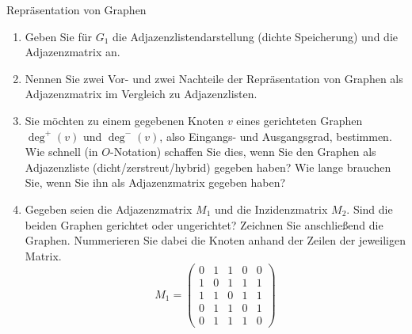 \documentclass[11pt,a4paper]{article}
\begin{document}
\begin{aufgabe}{1}{Repräsentation von Graphen}
\begin{figure}[h!]
    \end{figure}
    \begin{enumerate}
        \item Geben Sie für $G_1$ die Adjazenzlistendarstellung (dichte Speicherung) und die Adjazenzmatrix an.
        \item Nennen Sie zwei Vor- und zwei Nachteile der Repräsentation von Graphen als Adjazenzmatrix im Vergleich zu Adjazenzlisten.
        \item Sie möchten zu einem gegebenen Knoten $v$ eines gerichteten Graphen $\operatorname{deg}^+(v)$ und $\operatorname{deg}^-(v)$, also Eingangs- und Ausgangsgrad, bestimmen.
        Wie schnell (in $O$-Notation) schaffen Sie dies, wenn Sie den Graphen als Adjazenzliste (dicht/zerstreut/hybrid) gegeben haben?
        Wie lange brauchen Sie, wenn Sie ihn als Adjazenzmatrix gegeben haben?
        \item 
        Gegeben seien die Adjazenzmatrix $M_1$ und die Inzidenzmatrix $M_2$.
        Sind die beiden Graphen gerichtet oder ungerichtet?
        Zeichnen Sie anschließend die Graphen.
        Nummerieren Sie dabei die Knoten anhand der Zeilen der jeweiligen Matrix.
        \begin{equation*}
            M_1 = \begin{pmatrix}
                0 & 1 & 1 & 0 & 0 \\
                1 & 0 & 1 & 1 & 1 \\
                1 & 1 & 0 & 1 & 1 \\
                0 & 1 & 1 & 0 & 1 \\
                0 & 1 & 1 & 1 & 0 

\end{pmatrix}
\end{equation*}
\end{enumerate}
\end{aufgabe}
\end{document}
